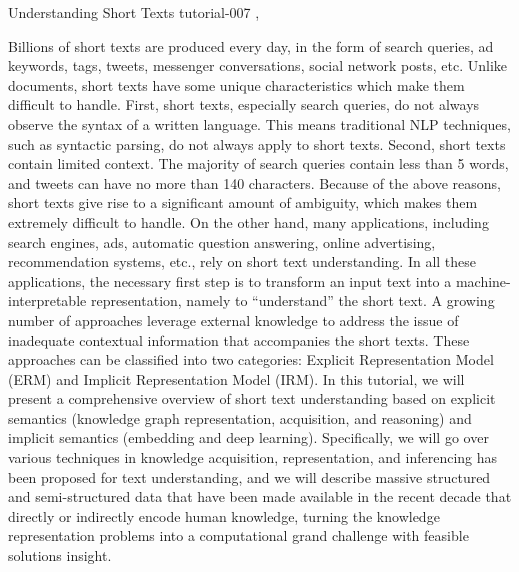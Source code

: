 
\begin{tutorial}
  {Understanding Short Texts}
  {tutorial-007}
  {\daydateyear, \tutorialafternoontime}

Billions of short texts are produced every day, in the form of search queries, ad keywords, tags, tweets, messenger conversations, social network posts, etc. Unlike documents, short texts have some unique characteristics which make them difficult to handle. First, short texts, especially search queries, do not always observe the syntax of a written language. This means traditional NLP techniques, such as syntactic parsing, do not always apply to short texts. Second, short texts contain limited context. The majority of search queries contain less than 5 words, and tweets can have no more than 140 characters. Because of the above reasons, short texts give rise to a significant amount of ambiguity, which makes them extremely difficult to handle. On the other hand, many applications, including search engines, ads, automatic question answering, online advertising, recommendation systems, etc., rely on short text understanding. In all these applications, the necessary first step is to transform an input text into a machine-interpretable representation, namely to ``understand'' the short text. A growing number of approaches leverage external knowledge to address the issue of inadequate contextual information that accompanies the short texts. These approaches can be classified into two categories: Explicit Representation Model (ERM) and Implicit Representation Model (IRM). In this tutorial, we will present a comprehensive overview of short text understanding based on explicit semantics (knowledge graph representation, acquisition, and reasoning) and implicit semantics (embedding and deep learning). Specifically, we will go over various techniques in knowledge acquisition, representation, and inferencing has been proposed for text understanding, and we will describe massive structured and semi-structured data that have been made available in the recent decade that directly or indirectly encode human knowledge, turning the knowledge representation problems into a computational grand challenge with feasible solutions insight.
\end{tutorial}

